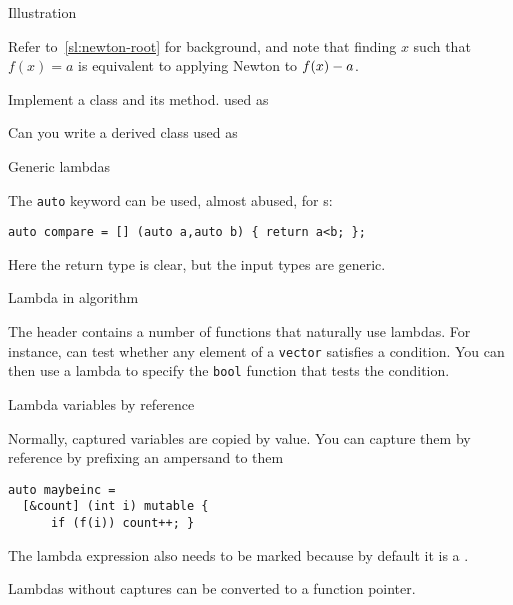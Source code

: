 \begin{block}{Illustration}
  \label{sl:lambda-classed}
\end{block}

\begin{exercise}
  \label{ex:newtonlambda}
  Refer to~\ref{sl:newton-root} for background, and note that finding
  $x$ such that $f(x)=a$ is equivalent to applying Newton to
  $f(x)-\nobreak a$.

  Implement a class  and its  method.
  used as
\end{exercise}

\begin{exercise}
  \label{ex:morenewtonlambda}
  Can you write a derived class  used as
\end{exercise}

 {Generic lambdas}
\label{sec:lambda-generic}

The \lstinline{auto} keyword can be used, almost abused, for
s:
\begin{lstlisting}
auto compare = [] (auto a,auto b) { return a<b; };
\end{lstlisting}
Here the return type is clear, but the input types are generic.


 {Lambda in algorithm}

The  header contains a number of functions that
naturally use lambdas. For instance,  can test
whether any element of a \lstinline{vector} satisfies a condition.
You can then use a lambda to specify the \lstinline{bool} function
that tests the condition.

 {Lambda variables by reference}

Normally, captured variables are copied by value. You can capture them
by reference by prefixing an ampersand to them
\begin{lstlisting}
auto maybeinc =
  [&count] (int i) mutable {
      if (f(i)) count++; }
\end{lstlisting}
The lambda expression also needs to be marked
because by default it is a
.


Lambdas without captures can be converted to a function pointer.
